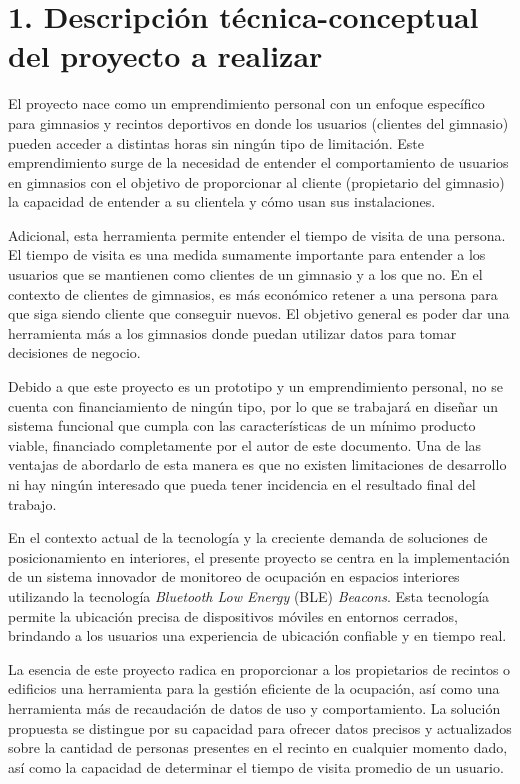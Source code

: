 \documentclass[
11pt, %
]{charter}
\begin{document}
\section{1. Descripción técnica-conceptual del proyecto a realizar}
\label{sec:descripcion}

El proyecto nace como un emprendimiento personal con un enfoque específico para gimnasios y recintos deportivos en donde los usuarios (clientes del gimnasio) pueden acceder a distintas horas sin ningún tipo de limitación. Este emprendimiento surge de la necesidad de entender el comportamiento de usuarios en gimnasios con el objetivo de proporcionar al cliente (propietario del gimnasio) la capacidad de entender a su clientela y cómo usan sus instalaciones. 

Adicional, esta herramienta permite entender el tiempo de visita de una persona. El tiempo de visita es una medida sumamente importante para entender a los usuarios que se mantienen como clientes de un gimnasio y a los que no. En el contexto de clientes de gimnasios, es más económico retener a una persona para que siga siendo cliente que conseguir nuevos. El objetivo general es poder dar una herramienta más a los gimnasios donde puedan utilizar datos para tomar decisiones de negocio.

Debido a que este proyecto es un prototipo y un emprendimiento personal, no se cuenta con financiamiento de ningún tipo, por lo que se trabajará en diseñar un sistema funcional que cumpla con las características de un mínimo producto viable, financiado completamente por el autor de este documento. Una de las ventajas de abordarlo de esta manera es que no existen limitaciones de desarrollo ni hay ningún interesado que pueda tener incidencia en el resultado final del trabajo.

En el contexto actual de la tecnología y la creciente demanda de soluciones de posicionamiento en interiores, el presente proyecto se centra en la implementación de un sistema innovador de monitoreo de ocupación en espacios interiores utilizando la tecnología \textit{Bluetooth Low Energy} (BLE) \textit{Beacons}. Esta tecnología permite la ubicación precisa de dispositivos móviles en entornos cerrados, brindando a los usuarios una experiencia de ubicación confiable y en tiempo real. 

La esencia de este proyecto radica en proporcionar a los propietarios de recintos o edificios una herramienta para la gestión eficiente de la ocupación, así como una herramienta más de recaudación de datos de uso y comportamiento. La solución propuesta se distingue por su capacidad para ofrecer datos precisos y actualizados sobre la cantidad de personas presentes en el recinto en cualquier momento dado, así como la capacidad de determinar el tiempo de visita promedio de un usuario.
\end{document}
